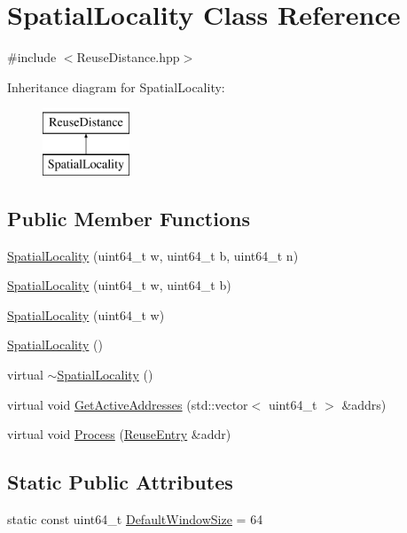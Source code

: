 \hypertarget{class_spatial_locality}{
\section{SpatialLocality Class Reference}
\label{class_spatial_locality}
}


{\ttfamily \#include $<$ReuseDistance.hpp$>$}

Inheritance diagram for SpatialLocality:\begin{figure}[H]
\begin{center}
\leavevmode
\includegraphics[height=2cm]{class_spatial_locality}
\end{center}
\end{figure}
\subsection*{Public Member Functions}
\begin{DoxyCompactItemize}
\item 
\hyperlink{class_spatial_locality_aff3106d38ff5ba3e6ecaec0c7214eaea}{SpatialLocality} (uint64\_\-t w, uint64\_\-t b, uint64\_\-t n)
\item 
\hyperlink{class_spatial_locality_a908469b7cd8a92c22a8bae4e2d4c5ade}{SpatialLocality} (uint64\_\-t w, uint64\_\-t b)
\item 
\hyperlink{class_spatial_locality_a63d45541023cfc370b079f1011cab5b8}{SpatialLocality} (uint64\_\-t w)
\item 
\hyperlink{class_spatial_locality_a449d21fbe63121ea92aaf5c1e0b8cb9c}{SpatialLocality} ()
\item 
virtual \hyperlink{class_spatial_locality_abfdaf3722786c5ad9ea65f885cbbebc6}{$\sim$SpatialLocality} ()
\item 
virtual void \hyperlink{class_spatial_locality_afef7ecfce7f238dbef37499e08edfb98}{GetActiveAddresses} (std::vector$<$ uint64\_\-t $>$ \&addrs)
\item 
virtual void \hyperlink{class_spatial_locality_a72a96a67e1791851927dbf3e5ceb206f}{Process} (\hyperlink{struct_reuse_entry}{ReuseEntry} \&addr)
\end{DoxyCompactItemize}
\subsection*{Static Public Attributes}
\begin{DoxyCompactItemize}
\item 
static const uint64\_\-t \hyperlink{class_spatial_locality_a563aa890ea539ae76c942fd1827a3095}{DefaultWindowSize} = 64
\end{DoxyCompactItemize}



